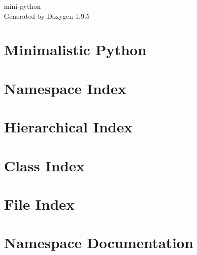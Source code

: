 \documentclass[twoside]{book}
\newcommand{\+}{\discretionary{\mbox{\scriptsize$\hookleftarrow$}}{}{}}
\newcommand{\clearemptydoublepage}{%
    \newpage{\pagestyle{empty}\cleardoublepage}%
  }
\begin{document}
  \raggedbottom
    \hypersetup{pageanchor=false,
                bookmarksnumbered=true,
                pdfencoding=unicode
               }
  \begin{titlepage}
  \vspace*{7cm}
  \begin{center}%
  {\Large mini-\/python}\\
  \vspace*{1cm}
  {\large Generated by Doxygen 1.9.5}\\
  \end{center}
  \end{titlepage}
  \clearemptydoublepage
  \tableofcontents
  \clearemptydoublepage
  \hypersetup{pageanchor=true}
\chapter{Minimalistic Python}
\label{index}\hypertarget{index}{}
\chapter{Namespace Index}

\chapter{Hierarchical Index}

\chapter{Class Index}

\chapter{File Index}

\chapter{Namespace Documentation}




\end{document}
